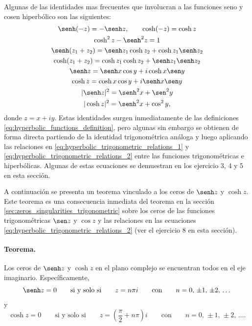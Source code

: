\documentclass[a4paper]{report}
\begin{document}
Algunas de las identidades mas frecuentes que involucran a las funciones seno y cosen hiperbólico son las siguientes:
\begin{gather}
 \senh(-z)=-\senh z,\qquad\cosh(-z)=\cosh z\label{eq:hyperbolic_relations_parity}\\
 \cosh^2z-\senh^2z=1\label{eq:hyperbolic_relations_square_substraction}\\
 \senh(z_1+z_2)=\senh z_1\cosh z_2+\cosh z_1\senh z_2\label{eq:hyperbolic_relations_senh_sum_arguments}\\ 
 \cosh(z_1+z_2)=\cosh z_1\cosh z_2+\senh z_1\senh z_2\label{eq:hyperbolic_relations_cosh_sum_arguments}\\
 \senh z=\senh x\cos y+i\cosh x\sen y\label{eq:hyperbolic_relations_senh_components}\\
 \cosh z=\cosh x\cos y+i\senh x\sen y\label{eq:hyperbolic_relations_cosh_components}\\
 |\senh z|^2=\senh^2x+\sen^2y\label{eq:hyperbolic_relations_senh_square_modulus}\\
 |\cosh z|^2=\senh^2x+\cos^2y,\label{eq:hyperbolic_relations_cosh_square_modulus}
\end{gather}
donde \(z=x+iy\). Estas identidades surgen inmediatamente de las definiciones \ref{eq:hyperbolic_functions_definition}, pero algunas sin embargo se obtienen de forma  directa partiendo de la identidad trigonométrica análoga y luego aplicando las relaciones en \ref{eq:hyperbolic_trigonometric_relations_1} y \ref{eq:hyperbolic_trigonometric_relations_2} entre las funciones trigonométricas e hiperbólicas. Algunas de estas ecuaciones se demuestran en los ejercicio 3, 4 y 5 en esta sección.

A continuación se presenta un teorema vinculado a los ceros de \(\senh z\) y \(\cosh z\). Este teorema es una consecuencia inmediata del teorema en la sección \ref{sec:zeros_singularities_trigonometric} sobre los ceros de las funciones trigonométricas \(\sen z\) y \(\cos z\) y las relaciones en las ecuaciones \ref{eq:hyperbolic_trigonometric_relations_2} (ver el ejercicio 8 en esta sección).

\paragraph{Teorema.} Los ceros de \(\senh z\) y \(\cosh z\) en el plano complejo se encuentran todos en el eje imaginario. Específicamente,
\[
 \senh z=0
 \qquad\textrm{si y solo si}\qquad
 z=n\pi i
 \qquad\textrm{con}\qquad 
 n=0,\,\pm1,\,\pm2,\,\dots
\]
y
\[
 \cosh z=0
 \qquad\textrm{si y solo si}\qquad
 z=\left(\frac{\pi}{2}+n\pi\right)i
 \qquad\textrm{con}\qquad 
 n=0,\,\pm1,\,\pm2,\,\dots.
\]
\end{document}

